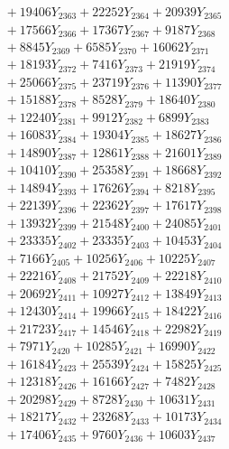 \documentclass[a4paper,10pt]{article}
\begin{document}
{\begin{align}
&\;  + 19406 Y_{2363} + 22252 Y_{2364} + 20939 Y_{2365} \\[0.3ex]
&\;  + 17566 Y_{2366} + 17367 Y_{2367} + 9187 Y_{2368} \\[0.5ex]\allowbreak
&\;  + 8845 Y_{2369} + 6585 Y_{2370} + 16062 Y_{2371} \\[0.3ex]
&\;  + 18193 Y_{2372} + 7416 Y_{2373} + 21919 Y_{2374} \\[0.3ex]
&\;  + 25066 Y_{2375} + 23719 Y_{2376} + 11390 Y_{2377} \\[0.3ex]
&\;  + 15188 Y_{2378} + 8528 Y_{2379} + 18640 Y_{2380} \\[0.3ex]
&\;  + 12240 Y_{2381} + 9912 Y_{2382} + 6899 Y_{2383} \\[0.3ex]
&\;  + 16083 Y_{2384} + 19304 Y_{2385} + 18627 Y_{2386} \\[0.3ex]
&\;  + 14890 Y_{2387} + 12861 Y_{2388} + 21601 Y_{2389} \\[0.3ex]
&\;  + 10410 Y_{2390} + 25358 Y_{2391} + 18668 Y_{2392} \\[0.3ex]
&\;  + 14894 Y_{2393} + 17626 Y_{2394} + 8218 Y_{2395} \\[0.3ex]
&\;  + 22139 Y_{2396} + 22362 Y_{2397} + 17617 Y_{2398} \\[0.5ex]\allowbreak
&\;  + 13932 Y_{2399} + 21548 Y_{2400} + 24085 Y_{2401} \\[0.3ex]
&\;  + 23335 Y_{2402} + 23335 Y_{2403} + 10453 Y_{2404} \\[0.3ex]
&\;  + 7166 Y_{2405} + 10256 Y_{2406} + 10225 Y_{2407} \\[0.3ex]
&\;  + 22216 Y_{2408} + 21752 Y_{2409} + 22218 Y_{2410} \\[0.3ex]
&\;  + 20692 Y_{2411} + 10927 Y_{2412} + 13849 Y_{2413} \\[0.3ex]
&\;  + 12430 Y_{2414} + 19966 Y_{2415} + 18422 Y_{2416} \\[0.3ex]
&\;  + 21723 Y_{2417} + 14546 Y_{2418} + 22982 Y_{2419} \\[0.3ex]
&\;  + 7971 Y_{2420} + 10285 Y_{2421} + 16990 Y_{2422} \\[0.3ex]
&\;  + 16184 Y_{2423} + 25539 Y_{2424} + 15825 Y_{2425} \\[0.3ex]
&\;  + 12318 Y_{2426} + 16166 Y_{2427} + 7482 Y_{2428} \\[0.5ex]\allowbreak
&\;  + 20298 Y_{2429} + 8728 Y_{2430} + 10631 Y_{2431} \\[0.3ex]
&\;  + 18217 Y_{2432} + 23268 Y_{2433} + 10173 Y_{2434} \\[0.3ex]
&\;  + 17406 Y_{2435} + 9760 Y_{2436} + 10603 Y_{2437} \\[0.3ex]

\end{align}}
\end{document}
